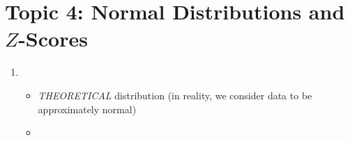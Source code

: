 \documentclass[12pt, A4]{report}
\begin{document}
		\chapter*{Topic 4: Normal Distributions and $Z$-Scores}
			\begin{enumerate}
				\item
					\begin{itemize}
						\item
							\emph{THEORETICAL}  distribution (in reality, we consider data to be approximately normal)
						\item
							
					\end{itemize}
			\end{enumerate}
\end{document}
